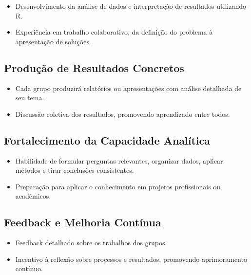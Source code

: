 \documentclass[
  letterpaper,
  DIV=11,
  numbers=noendperiod]{scrreprt}
\providecommand{\tightlist}{%
  \setlength{\itemsep}{0pt}\setlength{\parskip}{0pt}}
\begin{document}
\begin{itemize}
\tightlist
\item
  Desenvolvimento da análise de dados e interpretação de resultados
  utilizando R.\\
\item
  Experiência em trabalho colaborativo, da definição do problema à
  apresentação de soluções.
\end{itemize}

\subsection{Produção de Resultados
Concretos}\label{produuxe7uxe3o-de-resultados-concretos}

\begin{itemize}
\tightlist
\item
  Cada grupo produzirá relatórios ou apresentações com análise detalhada
  de seu tema.\\
\item
  Discussão coletiva dos resultados, promovendo aprendizado entre todos.
\end{itemize}

\subsection{Fortalecimento da Capacidade
Analítica}\label{fortalecimento-da-capacidade-analuxedtica}

\begin{itemize}
\tightlist
\item
  Habilidade de formular perguntas relevantes, organizar dados, aplicar
  métodos e tirar conclusões consistentes.\\
\item
  Preparação para aplicar o conhecimento em projetos profissionais ou
  acadêmicos.
\end{itemize}

\subsection{Feedback e Melhoria
Contínua}\label{feedback-e-melhoria-contuxednua}

\begin{itemize}
\tightlist
\item
  Feedback detalhado sobre os trabalhos dos grupos.\\
\item
  Incentivo à reflexão sobre processos e resultados, promovendo
  aprimoramento contínuo.
\end{itemize}
\end{document}
